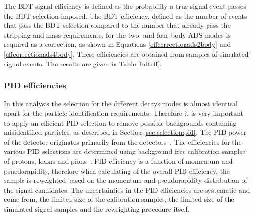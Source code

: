 The BDT signal efficiency is defined as the probability a true signal event passes the BDT selection imposed. The BDT efficiency, defined as the number of events that pass the BDT selection compared to the number that already pass the stripping and mass requirements, for the two- and four-body ADS modes is required as a correction, as shown in Equations \ref{effcorrectionads2body} and \ref{effcorrectionads4body}. These efficiencies are obtained from samples of simulated signal events. The results are given in Table \ref{bdteff}.

\begin{table}[h]
\centering
{}
\caption{Summary of the BDT efficiencies used in the \CP fit.}
\label{bdteff}
\end{table}


\subsubsection{PID efficiencies}
\label{sec:cpfit:efficiencies:pid}

In this analysis the selection for the different \Dz decays modes is almost identical apart for the particle identification requirements. Therefore it is very important to apply an efficient PID selection to remove possible backgrounds containing misidentified particles, as described in Section \ref{sec:selection:pid}. The PID power of the detector originates primarily from the \rich detectors~\cite{LHCb-DP-2012-003,richrun2}. The efficiencies for the various PID selections are determined using background free calibration samples of protons, kaons and pions~\cite{LHCb-PUB-2016-021,LHCb-PUB-2016-005}. PID efficiency is a function of momentum and psuedorapidity, therefore when calculating of the overall PID efficiency, the sample is reweighted based on the momentum and pseudorapidity distribution of the signal candidates. The uncertainties in the PID efficiencies are systematic and come from, the limited size of the calibration samples, the limited size of the simulated signal samples and the reweighting procedure itself.

